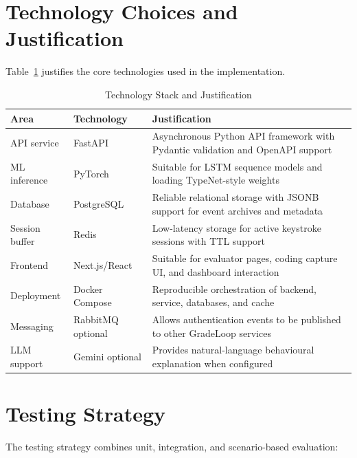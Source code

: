 \section{Technology Choices and Justification}
\label{sec:technology}

Table~\ref{tab:technology} justifies the core technologies used in the implementation.

\begin{table}[H]
  \centering
  \caption{Technology Stack and Justification}
  \label{tab:technology}
  \begin{singlespace}
  \begin{tabularx}{\textwidth}{@{}p{3.0cm}p{3.4cm}p{6.4cm}@{}}
    \toprule
    \textbf{Area} & \textbf{Technology} & \textbf{Justification} \\
    \midrule
    API service & FastAPI & Asynchronous Python API framework with Pydantic validation and OpenAPI support \\
    ML inference & PyTorch & Suitable for LSTM sequence models and loading TypeNet-style weights \\
    Database & PostgreSQL & Reliable relational storage with JSONB support for event archives and metadata \\
    Session buffer & Redis & Low-latency storage for active keystroke sessions with TTL support \\
    Frontend & Next.js/React & Suitable for evaluator pages, coding capture UI, and dashboard interaction \\
    Deployment & Docker Compose & Reproducible orchestration of backend, service, databases, and cache \\
    Messaging & RabbitMQ optional & Allows authentication events to be published to other GradeLoop services \\
    LLM support & Gemini optional & Provides natural-language behavioural explanation when configured \\
    \bottomrule
  \end{tabularx}
  \end{singlespace}
\end{table}

\section{Testing Strategy}
\label{sec:testing-strategy}

The testing strategy combines unit, integration, and scenario-based evaluation:


